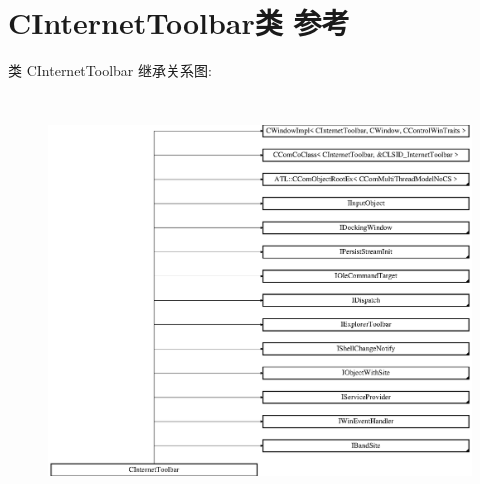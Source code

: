 \hypertarget{class_c_internet_toolbar}{}\section{C\+Internet\+Toolbar类 参考}
\label{class_c_internet_toolbar}
类 C\+Internet\+Toolbar 继承关系图\+:\begin{figure}[H]
\begin{center}
\leavevmode
\includegraphics[height=10.880829cm]{class_c_internet_toolbar}
\end{center}
\end{figure}
